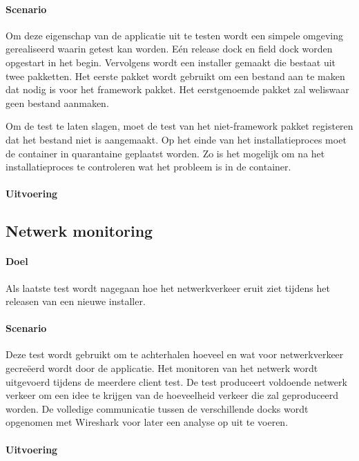 \paragraph{Scenario}
Om deze eigenschap van de applicatie uit te testen wordt een simpele omgeving gerealiseerd waarin getest kan worden.
Eén release dock en field dock worden opgestart in het begin.
Vervolgens wordt een installer gemaakt die bestaat uit twee pakketten.
Het eerste pakket wordt gebruikt om een bestand aan te maken dat nodig is voor het framework pakket.
Het eerstgenoemde pakket zal weliswaar geen bestand aanmaken.

Om de test te laten slagen, moet de test van het niet-framework pakket registeren dat het bestand niet is aangemaakt.
Op het einde van het installatieproces moet de container in quarantaine geplaatst worden.
Zo is het mogelijk om na het installatieproces te controleren wat het probleem is in de container.

\paragraph{Uitvoering}


\subsection{Netwerk monitoring}
\paragraph{Doel}
Als laatste test wordt nagegaan hoe het netwerkverkeer eruit ziet tijdens het releasen van een nieuwe installer.

\paragraph{Scenario}
Deze test wordt gebruikt om te achterhalen hoeveel en wat voor netwerkverkeer gecreëerd wordt door de applicatie.
Het monitoren van het netwerk wordt uitgevoerd tijdens de meerdere client test.
De test produceert voldoende netwerk verkeer om een idee te krijgen van de hoeveelheid verkeer die zal geproduceerd worden.
De volledige communicatie tussen de verschillende docks wordt opgenomen met Wireshark voor later een analyse op uit te voeren.

\paragraph{Uitvoering}


